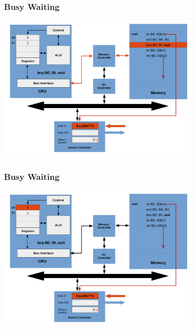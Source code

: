 \documentclass{beamer}
\begin{document}
\begin{frame}%
\frametitle{Busy Waiting}

\vspace*{-0.2cm}
\begin{center}
\hspace*{-1cm}\includegraphics[width=10cm]{busy_waiting9.pdf}
\end{center}

\end{frame}

\begin{frame}%
\frametitle{Busy Waiting}

\vspace*{-0.2cm}
\begin{center}
\hspace*{-1cm}\includegraphics[width=10cm]{busy_waiting10.pdf}
\end{center}

\end{frame}
\end{document}
